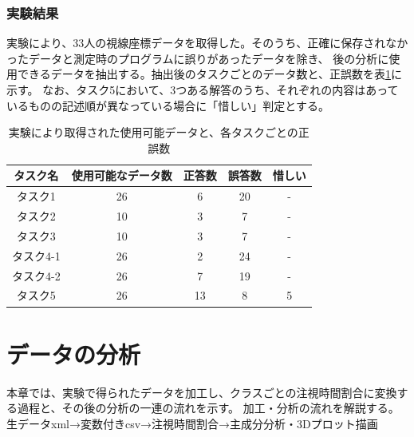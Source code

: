 \documentclass[paper=a4paper,fontsize=11pt]{jlreq}
\begin{document}
  \section{実験結果}
    実験により、33人の視線座標データを取得した。そのうち、正確に保存されなかったデータと測定時のプログラムに誤りがあったデータを除き、
    後の分析に使用できるデータを抽出する。抽出後のタスクごとのデータ数と、正誤数を表\ref{data_num}に示す。
    なお、タスク5において、3つある解答のうち、それぞれの内容はあっているものの記述順が異なっている場合に「惜しい」判定とする。\\
    \begin{table}[h]
      \centering
      \caption{実験により取得された使用可能データと、各タスクごとの正誤数}
      \begin{tabular}{|c|c|c|c|c|}
        \hline
        タスク名&使用可能なデータ数&正答数&誤答数&惜しい\\ \hline
        タスク1&26&6&20&-\\ \hline
        タスク2&10&3&7&-\\ \hline
        タスク3&10&3&7&-\\ \hline
        タスク4-1&26&2&24&-\\ \hline
        タスク4-2&26&7&19&-\\ \hline
        タスク5&26&13&8&5\\ \hline
      \end{tabular}
      \label{data_num}
    \end{table}
   \FloatBarrier


\clearpage

\part{データの分析}
  本章では、実験で得られたデータを加工し、クラスごとの注視時間割合に変換する過程と、その後の分析の一連の流れを示す。
  加工・分析の流れを解説する。\\

  生データxml→変数付きcsv→注視時間割合→主成分分析・3Dプロット描画\\
\end{document}
